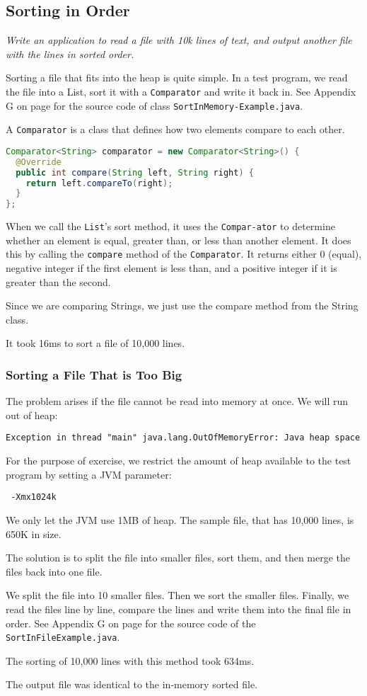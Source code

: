 \subsection{Sorting in Order}
\textit{Write an application to read a file with 10k lines of text, and output another file with the lines in sorted order.}

Sorting a file that fits into the heap is quite simple. In a test program, we read the file into a List, sort it with a \texttt{Comparator} and write it back in. See Appendix G on page \pageref{App:AppendixG} for the source code of class \texttt{SortInMemory\hyp{}Example.java}.

A \texttt{Comparator} is a class that defines how two elements compare to each other.
\begin{lstlisting}[language=Java]
Comparator<String> comparator = new Comparator<String>() {
  @Override
  public int compare(String left, String right) {
    return left.compareTo(right);
  }
};
\end{lstlisting}

When we call the \texttt{List}'s sort method, it uses the \texttt{Compar\hyp{}ator} to determine whether an element is equal, greater than, or less than another element. It does this by calling the \texttt{compare} method of the \texttt{Comparator}. It returns either 0 (equal), negative integer if the first element is less than, and a positive integer if it is greater than the second.

Since we are comparing Strings, we just use the compare method from the String class.

It took 16ms to sort a file of 10,000 lines.

\subsubsection{Sorting a File That is Too Big}

The problem arises if the file cannot be read into memory at once. We will run out of heap:
\begin{lstlisting}
Exception in thread "main" java.lang.OutOfMemoryError: Java heap space
\end{lstlisting}

For the purpose of exercise, we restrict the amount of heap available to the test program by setting a JVM parameter:
\begin{lstlisting}
 -Xmx1024k
\end{lstlisting}
We only let the JVM use 1MB of heap. The sample file, that has 10,000 lines, is 650K in size. 

The solution is to split the file into smaller files, sort them, and then merge the files back into one file.

We split the file into 10 smaller files. Then we sort the smaller files. Finally, we read the files line by line, compare the lines and write them into the final file in order.  See Appendix G on page \pageref{App:AppendixG} for the source code of the \texttt{SortInFileExample.java}.

The sorting of 10,000 lines with this method took 634ms.

The output file was identical to the in-memory sorted file.